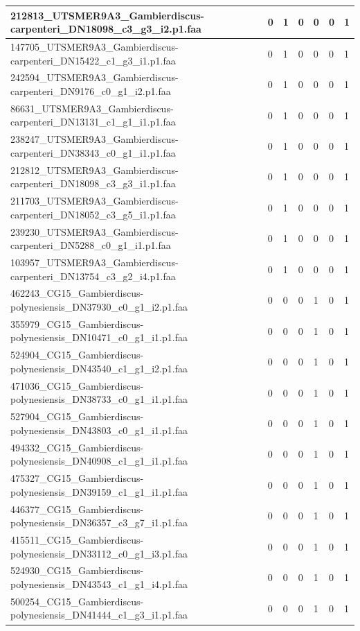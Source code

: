 \documentclass[12pt]{article}
\begin{document}
\begin{longtable}{ | p{2cm} | p{2cm} |p{2.5cm} | p{2cm} | p{2.5cm} |  p{2cm} | p{2cm} |}
 \hline 
212813\_UTSMER9A3\_Gambierdiscus-carpenteri\_DN18098\_c3\_g3\_i2.p1.faa&0&1&0&0&0&1\\ 
 \hline 
147705\_UTSMER9A3\_Gambierdiscus-carpenteri\_DN15422\_c1\_g3\_i1.p1.faa&0&1&0&0&0&1\\ 
 \hline 
242594\_UTSMER9A3\_Gambierdiscus-carpenteri\_DN9176\_c0\_g1\_i2.p1.faa&0&1&0&0&0&1\\ 
 \hline 
86631\_UTSMER9A3\_Gambierdiscus-carpenteri\_DN13131\_c1\_g1\_i1.p1.faa&0&1&0&0&0&1\\ 
 \hline 
238247\_UTSMER9A3\_Gambierdiscus-carpenteri\_DN38343\_c0\_g1\_i1.p1.faa&0&1&0&0&0&1\\ 
 \hline 
212812\_UTSMER9A3\_Gambierdiscus-carpenteri\_DN18098\_c3\_g3\_i1.p1.faa&0&1&0&0&0&1\\ 
 \hline 
211703\_UTSMER9A3\_Gambierdiscus-carpenteri\_DN18052\_c3\_g5\_i1.p1.faa&0&1&0&0&0&1\\ 
 \hline 
239230\_UTSMER9A3\_Gambierdiscus-carpenteri\_DN5288\_c0\_g1\_i1.p1.faa&0&1&0&0&0&1\\ 
 \hline 
103957\_UTSMER9A3\_Gambierdiscus-carpenteri\_DN13754\_c3\_g2\_i4.p1.faa&0&1&0&0&0&1\\ 
 \hline 
462243\_CG15\_Gambierdiscus-polynesiensis\_DN37930\_c0\_g1\_i2.p1.faa&0&0&0&1&0&1\\ 
 \hline 
355979\_CG15\_Gambierdiscus-polynesiensis\_DN10471\_c0\_g1\_i1.p1.faa&0&0&0&1&0&1\\ 
 \hline 
524904\_CG15\_Gambierdiscus-polynesiensis\_DN43540\_c1\_g1\_i2.p1.faa&0&0&0&1&0&1\\ 
 \hline 
471036\_CG15\_Gambierdiscus-polynesiensis\_DN38733\_c0\_g1\_i1.p1.faa&0&0&0&1&0&1\\ 
 \hline 
527904\_CG15\_Gambierdiscus-polynesiensis\_DN43803\_c0\_g1\_i1.p1.faa&0&0&0&1&0&1\\ 
 \hline 
494332\_CG15\_Gambierdiscus-polynesiensis\_DN40908\_c1\_g1\_i1.p1.faa&0&0&0&1&0&1\\ 
 \hline 
475327\_CG15\_Gambierdiscus-polynesiensis\_DN39159\_c1\_g1\_i1.p1.faa&0&0&0&1&0&1\\ 
 \hline 
446377\_CG15\_Gambierdiscus-polynesiensis\_DN36357\_c3\_g7\_i1.p1.faa&0&0&0&1&0&1\\ 
 \hline 
415511\_CG15\_Gambierdiscus-polynesiensis\_DN33112\_c0\_g1\_i3.p1.faa&0&0&0&1&0&1\\ 
 \hline 
524930\_CG15\_Gambierdiscus-polynesiensis\_DN43543\_c1\_g1\_i4.p1.faa&0&0&0&1&0&1\\ 
 \hline 
500254\_CG15\_Gambierdiscus-polynesiensis\_DN41444\_c1\_g3\_i1.p1.faa&0&0&0&1&0&1\\ 

\end{longtable}
\end{document}
